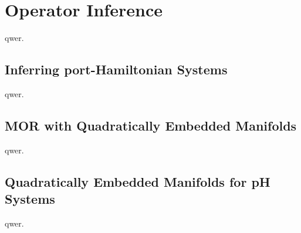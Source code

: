 \chapter{Operator Inference}\label{chap:operator-inference}

qwer.

\section{Inferring port-Hamiltonian Systems}\label{sec:inferring-ph-systems}

qwer.

\section{MOR with Quadratically Embedded Manifolds}\label{sec:mor-quadratically-embedded-manifolds}

qwer.

\section{Quadratically Embedded Manifolds for pH Systems}\label{sec:quadratically-embedded-manifolds-ph-systems}

qwer.
